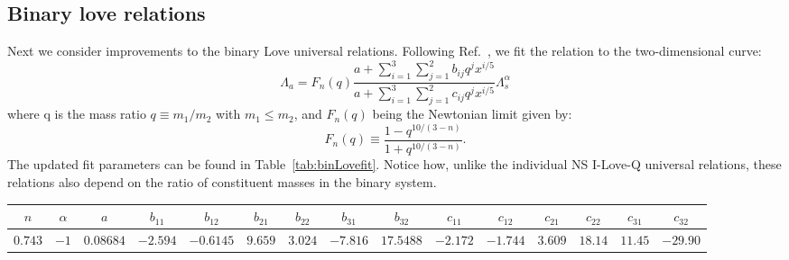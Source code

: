 \documentclass[prd,twocolumn,nofootinbib,superscriptaddress,amsmath,amssymb]{revtex4-1}
\begin{document}
\subsection{Binary love relations}\label{sec:binary}
Next we consider improvements to the binary Love universal relations.
Following Ref.~\cite{Yagi:binLove}, we fit the relation to the two-dimensional curve:
\begin{equation}\label{eq:binLovefit}
\Lambda_a=F_n(q) \frac{a+ \sum_{i=1}^3 \sum_{j=1}^2 b_{ij}q^j x^{i/5}}{a+ \sum_{i=1}^3 \sum_{j=1}^2 c_{ij}q^j x^{i/5}} \Lambda_s^{\alpha}
\end{equation}
where q is the mass ratio $q \equiv m_1/m_2$ with $m_1 \leq m_2$, and $F_n(q)$ being the Newtonian limit given by:
\begin{equation}
F_n(q) \equiv \frac{1-q^{10/(3-n)}}{1+q^{10/(3-n)}}.
\end{equation}
The updated fit parameters can be found in Table~\ref{tab:binLovefit}.
Notice how, unlike the individual NS I-Love-Q universal relations, these relations also depend on the ratio of constituent masses in the binary system.
\begin{table*}[ht!]
\centering
\caption{
Updated fit parameters for the binary Love universal relations, as given by the curve found in Eq.~\ref{eq:binLovefit}.
}\label{tab:binLovefit}
\addtolength{\tabcolsep}{1pt} 
\begin{tabular}{ c  c  c  c  c  c  c  c  c  c  c  c  c  c  c} 
 \hline
 \hline
 $n$ & $\alpha$ & $a$ & $b_{11}$ & $b_{12}$ & $b_{21}$ & $b_{22}$ & $b_{31}$ & $b_{32}$ & $c_{11}$ & $c_{12}$ & $c_{21}$ & $c_{22}$ & $c_{31}$ & $c_{32}$\\
 \hline
 $0.743$ & $-1$ & $0.08684$ & $-2.594$ & $-0.6145$ & $9.659$ & $3.024$ & $-7.816$ & $17.5488$ & $-2.172$ & $-1.744$ & $3.609$ & $18.14$ & $11.45$ & $-29.90$\\
\hline
 \hline
\end{tabular}
\addtolength{\tabcolsep}{-1pt}
\end{table*}
\end{document}

